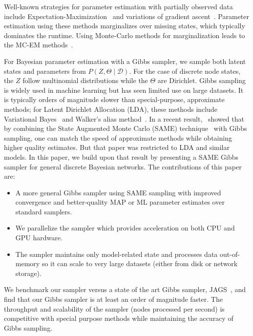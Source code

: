 \documentclass{article} %
\begin{document}
Well-known strategies for parameter estimation with partially observed
data include Expectation-Maximization~\citep{EMpaper} and variations
of gradient ascent~\citep{Thiesson95}.  Parameter estimation using
these methods marginalizes over missing states, which typically
dominates the runtime. Using Monte-Carlo methods for marginalization
leads to the MC-EM methods~\citep{MC-EM}.

For Bayesian parameter estimation with a Gibbs sampler, we sample both latent states and parameters
from $P(Z,\Theta \mid \mathcal{D})$.  For the case of discrete node states, the $Z$ follow
multinomial distributions while the $\Theta$ are Dirichlet. Gibbs sampling is widely used in machine
learning but has seen limited use on large datasets.  It is typically orders of magnitude slower
than special-purpose, approximate methods; for Latent Dirichlet Allocation (LDA), these methods
include Variational Bayes~\citep{Blei2003} and Walker's alias method~\citep{WalkersAlias_2014}.  In
a recent result,~\citet{SAME2015} showed that by combining the State Augmented Monte Carlo (SAME)
technique~\citep{SAME2002} with Gibbs sampling, one can match the speed of approximate methods while
obtaining higher quality estimates. But that paper was restricted to LDA and similar models.  In
this paper, we build upon that result by presenting a SAME Gibbs sampler for general discrete
Bayesian networks. The contributions of this paper are:

\begin{itemize}[noitemsep]
    \item A more general Gibbs sampler using SAME sampling with improved convergence and better-quality MAP or ML parameter
      estimates over standard samplers.
    \item We parallelize the sampler which provides acceleration on both CPU and GPU
      hardware.
    \item The sampler maintains only model-related state and processes data out-of-memory
      so it can scale to very large datasets (either from disk or network storage).
\end{itemize}

We benchmark our sampler versus a state of the art Gibbs sampler,
JAGS~\citep{JAGS2003}, and find that our Gibbs sampler is at least
an order of magnitude faster. The throughput and scalability of the
sampler (nodes processed per second) is competitive with special
purpose methods while maintaining the accuracy of Gibbs sampling.
\end{document}
